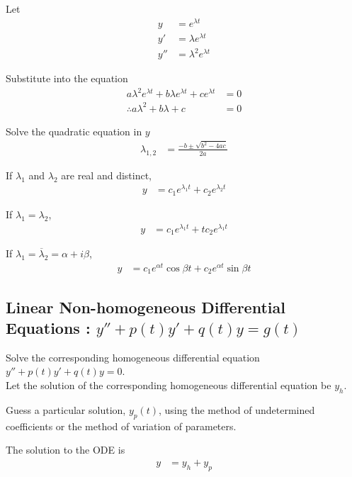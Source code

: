 \documentclass[fleqn, a4paper, 8pt, twoside]{amsart}
\theoremstyle{definition}
\theoremstyle{theorem}
\begin{document}
\begin{multicols}{2}
\begin{spacing}{0.85}
\begin{algorithmic}[1]
	\item
		Let
		\begin{align*}
			y &= e^{\lambda t}\\
			y' &= \lambda e^{\lambda t}\\
			y'' &= \lambda^2 e^{\lambda t}
		\end{align*}
	\item
		Substitute into the equation
		\begin{align*}
			a \lambda^2 e^{\lambda t} + b \lambda e^{\lambda t} + c e^{\lambda t} &= 0\\
			\therefore a \lambda^2 + b \lambda + c &= 0 
		\end{align*}
	\item
		Solve the quadratic equation in $y$
		\begin{align*}
			\lambda_{1,2} &= \frac{-b \pm \sqrt{b^2 - 4 a c}}{2 a}
		\end{align*}
	\item
		If $\lambda_1$ and $\lambda_2$ are real and distinct,
		\begin{align*}
			y &= c_1 e^{\lambda_1 t} + c_2 e^{\lambda_2 t}
		\end{align*}
	\item
		If $\lambda_1 = \lambda_2$,
		\begin{align*}
			y &= c_1 e^{\lambda_1 t} + t c_2 e^{\lambda_1 t}
		\end{align*}
	\item
		If $\lambda_1 = \overline \lambda_2 = \alpha + i \beta$,
		\begin{align*}
			y &= c_1 e^{\alpha t} \cos \beta t + c_2 e^{\alpha t} \sin \beta t
		\end{align*}
\end{algorithmic}

\subsection{Linear Non-homogeneous Differential Equations : $y'' + p(t) y' + q(t) y = g(t)$}

\begin{algorithmic}[1]
	\item
		Solve the corresponding homogeneous differential equation $y'' + p(t) y' + q(t) y = 0$.\\
		Let the solution of the corresponding homogeneous differential equation be $y_h$.
	\item
		Guess a particular solution, $y_p(t)$, using the method of undetermined coefficients or the method of variation of parameters.
	\item
		The solution to the ODE is
		\begin{align*}
			y &= y_h + y_p
		\end{align*}
\end{algorithmic}


\end{spacing}
\end{multicols}
\end{document}
